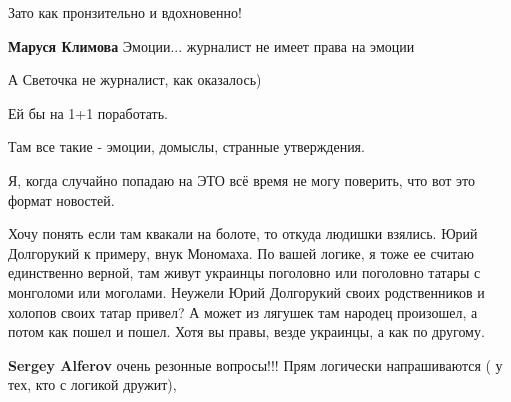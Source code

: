 \begin{itemize}
\begin{itemize}
Зато как пронзительно и вдохновенно!🤣🤣🤣

 
\textbf{Маруся Климова}
Эмоции... журналист не имеет права на эмоции

 
А Светочка не журналист, как оказалось)

Ей бы на 1+1 поработать.

Там все такие - эмоции, домыслы, странные утверждения.

Я, когда случайно попадаю на ЭТО всё время не могу поверить, что вот это формат
новостей.

\end{itemize}

 

Хочу понять если там квакали на болоте, то откуда людишки взялись. Юрий
Долгорукий к примеру, внук Мономаха. По вашей логике, я тоже ее считаю
единственно верной, там живут украинцы поголовно или поголовно татары с
монголоми или моголами. Неужели Юрий Долгорукий своих родственников и холопов
своих татар привел? А может из лягушек там народец произошел, а потом как пошел
и пошел. Хотя вы правы, везде украинцы, а как по другому.

\begin{itemize}
 
\textbf{Sergey Alferov} очень резонные вопросы!!! Прям логически напрашиваются ( у тех, кто с логикой дружит),
\end{itemize}

 

\end{itemize}
